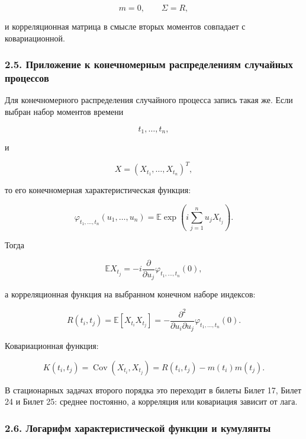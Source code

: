 \documentclass[
  11pt,
  a4paper,
]{article}
\begin{document}
\[
m=0,
\qquad
\Sigma=R,
\]

и корреляционная матрица в смысле вторых моментов совпадает с
ковариационной.

\subsubsection{2.5. Приложение к конечномерным распределениям случайных
процессов}\label{ux43fux440ux438ux43bux43eux436ux435ux43dux438ux435-ux43a-ux43aux43eux43dux435ux447ux43dux43eux43cux435ux440ux43dux44bux43c-ux440ux430ux441ux43fux440ux435ux434ux435ux43bux435ux43dux438ux44fux43c-ux441ux43bux443ux447ux430ux439ux43dux44bux445-ux43fux440ux43eux446ux435ux441ux441ux43eux432}

Для конечномерного распределения случайного процесса запись такая же.
Если выбран набор моментов времени

\[
t_1,\ldots,t_n,
\]

и

\[
X=(X_{t_1},\ldots,X_{t_n})^T,
\]

то его конечномерная характеристическая функция:

\[
\varphi_{t_1,\ldots,t_n}(u_1,\ldots,u_n)
=
\mathbb E\exp\left(i\sum_{j=1}^n u_jX_{t_j}\right).
\]

Тогда

\[
\mathbb EX_{t_j}
=
-i\frac{\partial}{\partial u_j}
\varphi_{t_1,\ldots,t_n}(0),
\]

а корреляционная функция на выбранном конечном наборе индексов:

\[
R(t_i,t_j)
=
\mathbb E[X_{t_i}X_{t_j}]
=
-\frac{\partial^2}{\partial u_i\partial u_j}
\varphi_{t_1,\ldots,t_n}(0).
\]

Ковариационная функция:

\[
K(t_i,t_j)
=
\operatorname{Cov}(X_{t_i},X_{t_j})
=
R(t_i,t_j)-m(t_i)m(t_j).
\]

В стационарных задачах второго порядка это переходит в билеты Билет 17,
Билет 24 и Билет 25: среднее постоянно, а корреляция или ковариация
зависит от лага.

\subsubsection{2.6. Логарифм характеристической функции и
кумулянты}\label{ux43bux43eux433ux430ux440ux438ux444ux43c-ux445ux430ux440ux430ux43aux442ux435ux440ux438ux441ux442ux438ux447ux435ux441ux43aux43eux439-ux444ux443ux43dux43aux446ux438ux438-ux438-ux43aux443ux43cux443ux43bux44fux43dux442ux44b}
\end{document}
